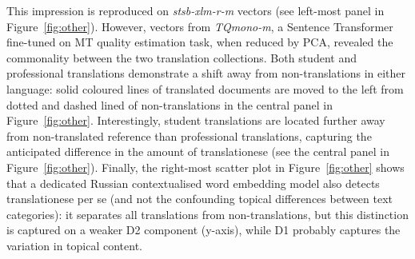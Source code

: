 This impression is reproduced on \textit{stsb-xlm-r-m} vectors (see left-most panel in Figure~\ref{fig:other}). 
However, vectors from \textit{TQmono-m}, a Sentence Transformer fine-tuned on MT quality estimation task, when reduced by PCA, revealed the commonality between the two translation collections. Both student and professional translations demonstrate a shift away from non-translations in either language: solid coloured lines of translated documents are moved to the left from dotted and dashed lined of non-translations in the central panel in Figure~\ref{fig:other}. Interestingly, student translations are located further away from non-translated reference than professional translations, capturing the anticipated difference in the amount of translationese (see the central panel in Figure~\ref{fig:other}). 
Finally, the right-most scatter plot in Figure~\ref{fig:other} shows that a dedicated Russian contextualised word embedding model also detects translationese per se (and not the confounding topical differences between text categories): it separates all translations from non-translations, but this distinction is captured on a weaker D2 component (y-axis), while D1 probably captures the variation in topical content.   

